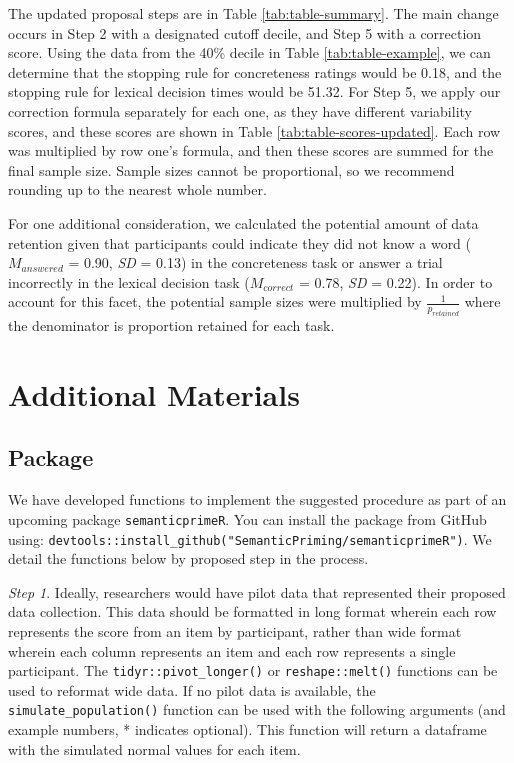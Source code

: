 \documentclass[
  man]{apa7}
\begin{document}
The updated proposal steps are in Table \ref{tab:table-summary}. The main change occurs in Step 2 with a designated cutoff decile, and Step 5 with a correction score. Using the data from the 40\% decile in Table \ref{tab:table-example}, we can determine that the stopping rule for concreteness ratings would be 0.18, and the stopping rule for lexical decision times would be 51.32. For Step 5, we apply our correction formula separately for each one, as they have different variability scores, and these scores are shown in Table \ref{tab:table-scores-updated}. Each row was multiplied by row one's formula, and then these scores are summed for the final sample size. Sample sizes cannot be proportional, so we recommend rounding up to the nearest whole number.

For one additional consideration, we calculated the potential amount of data retention given that participants could indicate they did not know a word (\(M_{answered}\) = 0.90, \emph{SD} = 0.13) in the concreteness task or answer a trial incorrectly in the lexical decision task (\(M_{correct}\) = 0.78, \emph{SD} = 0.22). In order to account for this facet, the potential sample sizes were multiplied by \(\frac{1}{p_{retained}}\) where the denominator is proportion retained for each task.

\hypertarget{additional-materials}{%
\section{Additional Materials}\label{additional-materials}}

\hypertarget{package}{%
\subsection{Package}\label{package}}

We have developed functions to implement the suggested procedure as part of an upcoming package \texttt{semanticprimeR}. You can install the package from GitHub using: \texttt{devtools::install\_github("SemanticPriming/semanticprimeR")}. We detail the functions below by proposed step in the process.

\emph{Step 1}. Ideally, researchers would have pilot data that represented their proposed data collection. This data should be formatted in long format wherein each row represents the score from an item by participant, rather than wide format wherein each column represents an item and each row represents a single participant. The \texttt{tidyr::pivot\_longer()} or \texttt{reshape::melt()} functions can be used to reformat wide data. If no pilot data is available, the \texttt{simulate\_population()} function can be used with the following arguments (and example numbers, * indicates optional). This function will return a dataframe with the simulated normal values for each item.
\end{document}
